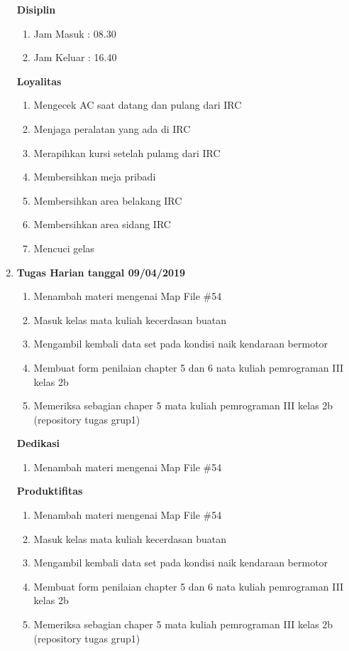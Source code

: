 \begin{enumerate}
\textbf{Disiplin}
\begin{enumerate}
\item Jam Masuk : 08.30
\item Jam Keluar : 16.40
\end{enumerate}

\textbf{Loyalitas}
\begin{enumerate}
\item Mengecek AC saat datang dan pulang dari IRC
\item Menjaga peralatan yang ada di IRC
\item Merapihkan kursi setelah pulamg dari IRC
\item Membersihkan meja pribadi
\item Membersihkan area belakang IRC
\item Membersihkan area sidang IRC
\item Mencuci gelas
\end{enumerate}


\item \textbf{Tugas Harian tanggal 09/04/2019}
\begin{enumerate}
\item Menambah materi mengenai Map File \#54
\item Masuk kelas mata kuliah kecerdasan buatan 
\item Mengambil kembali data set pada kondisi naik kendaraan bermotor
\item Membuat form penilaian chapter 5 dan 6 nata kuliah pemrograman III kelas 2b
\item Memeriksa sebagian chaper 5 mata kuliah pemrograman III kelas 2b (repository tugas grup1) 
\end{enumerate}

\textbf{Dedikasi}
\begin{enumerate}
\item Menambah materi mengenai Map File \#54
\end{enumerate}

\textbf{Produktifitas}
\begin{enumerate}
\item Menambah materi mengenai Map File \#54
\item Masuk kelas mata kuliah kecerdasan buatan 
\item Mengambil kembali data set pada kondisi naik kendaraan bermotor
\item Membuat form penilaian chapter 5 dan 6 nata kuliah pemrograman III kelas 2b
\item Memeriksa sebagian chaper 5 mata kuliah pemrograman III kelas 2b (repository tugas grup1) 
\end{enumerate}


\end{enumerate}
